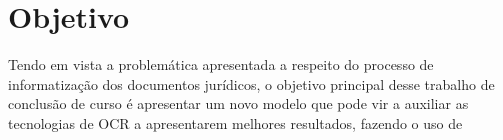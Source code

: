 \newpage

\section{Objetivo}

Tendo em vista a problemática apresentada a respeito do processo de informatização dos documentos jurídicos, o objetivo principal desse trabalho de conclusão de curso é apresentar um novo modelo que pode vir a auxiliar as tecnologias de OCR a apresentarem melhores resultados, fazendo o uso de 




